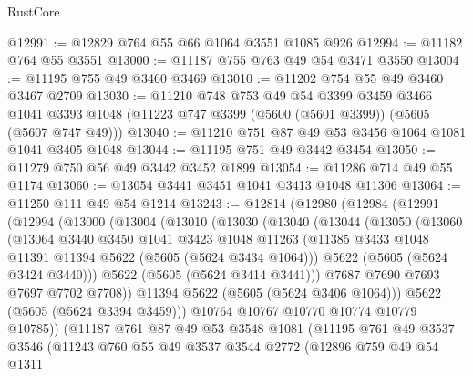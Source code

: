 \begin{lexlean}{RustCore}
\begin{coremodule}
@12991 := @12829 @764 @55 @66 @1064 @3551 @1085 @926
@12994 := @11182 @764 @55 @3551
@13000 := @11187 @755 @763 @49 @54 @3471 @3550
@13004 := @11195 @755 @49 @3460 @3469
@13010 := @11202 @754 @55 @49 @3460 @3467 @2709
@13030 := @11210
    @748
    @753
    @49
    @54
    @3399
    @3459
    @3466
    @1041
    @3393
    @1048
    (@11223 @747 @3399 (@5600 (@5601 @3399)) (@5605 (@5607 @747 @49)))
@13040 := @11210 @751 @87 @49 @53 @3456 @1064 @1081 @1041 @3405 @1048
@13044 := @11195 @751 @49 @3442 @3454
@13050 := @11279 @750 @56 @49 @3442 @3452 @1899
@13054 := @11286 @714 @49 @55 @1174
@13060 := @13054 @3441 @3451 @1041 @3413 @1048 @11306
@13064 := @11250 @111 @49 @54 @1214
@13243 := @12814
    (@12980
      (@12984
        (@12991
          (@12994
            (@13000
              (@13004
                (@13010
                  (@13030
                    (@13040
                      (@13044
                        (@13050
                          (@13060
                            (@13064
                              @3440
                              @3450
                              @1041
                              @3423
                              @1048
                              @11263
                              (@11385 @3433 @1048 @11391 @11394 @5622 (@5605 (@5624 @3434 @1064)))
                              @5622
                              (@5605 (@5624 @3424 @3440)))
                            @5622
                            (@5605 (@5624 @3414 @3441)))
                          @7687
                          @7690
                          @7693
                          @7697
                          @7702
                          @7708))
                      @11394
                      @5622
                      (@5605 (@5624 @3406 @1064)))
                    @5622
                    (@5605 (@5624 @3394 @3459)))
                  @10764
                  @10767
                  @10770
                  @10774
                  @10779
                  @10785))
              (@11187
                @761
                @87
                @49
                @53
                @3548
                @1081
                (@11195
                  @761
                  @49
                  @3537
                  @3546
                  (@11243
                    @760
                    @55
                    @49
                    @3537
                    @3544
                    @2772
                    (@12896
                      @759
                      @49
                      @54
                      @1311

\end{coremodule}
\end{lexlean}
